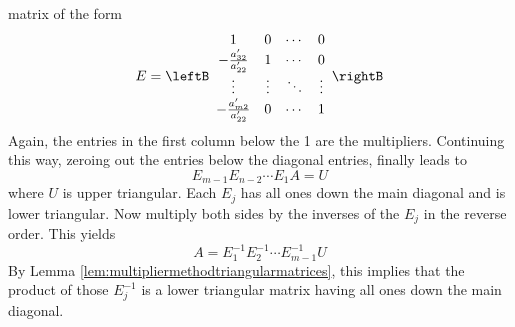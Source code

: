 matrix of the form 
\begin{equation*}
E=\leftB 
\begin{array}{cccc}
1 & 0 & \cdots & 0 \\ 
-\frac{a_{32}^{\prime }}{a_{22}^{\prime }} & 1 & \cdots & 0 \\ 
\vdots & \vdots & \ddots & \vdots \\ 
-\frac{a_{m2}^{\prime }}{a_{22}^{\prime }} & 0 & \cdots & 1
\end{array}
\rightB
\end{equation*}
Again, the entries in the first column below the 1 are the multipliers.
Continuing this way, zeroing out the entries below the diagonal entries,
finally leads to 
\begin{equation*}
E_{m-1}E_{n-2}\cdots E_{1}A=U
\end{equation*}
where $U$ is upper triangular. Each $E_{j}$ has all ones down the main
diagonal and is lower triangular. Now multiply both sides by the inverses of
the $E_{j}$ in the reverse order$.$ This yields 
\begin{equation*}
A=E_{1}^{-1}E_{2}^{-1}\cdots E_{m-1}^{-1}U
\end{equation*}
By Lemma \ref{lem:multipliermethodtriangularmatrices}, this implies that the product of those $E_{j}^{-1}$
is a lower triangular matrix having all ones down the main diagonal.

